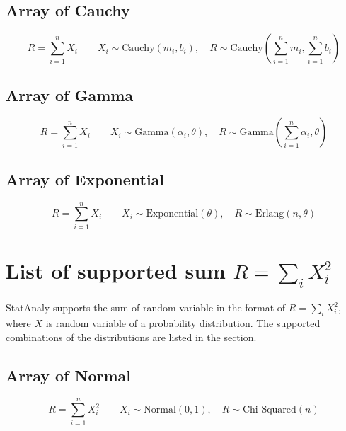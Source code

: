\subsection{Array of Cauchy}

    \begin{equation}
        R = \sum_{i=1}^n X_i \qquad 
        X_i \sim \text{Cauchy}(m_i,b_i), \quad 
        R \sim \text{Cauchy}\left(\sum _{i=1}^{n}m_{i},\sum _{i=1}^{n}b _{i}\right)
    \end{equation}

\subsection{Array of Gamma}

    \begin{equation}
        R = \sum_{i=1}^n X_i \qquad 
        X_i \sim \text{Gamma}(\alpha_i,\theta), \quad 
        R \sim \text{Gamma}\left(\sum _{i=1}^{n}\alpha_{i},\theta \right)
    \end{equation}

\subsection{Array of Exponential}

    \begin{equation}
        R = \sum_{i=1}^n X_i \qquad 
        X_i \sim \text{Exponential}(\theta), \quad 
        R \sim \text{Erlang}\left(n, \theta \right)
    \end{equation}


\section{List of supported sum $R = \sum_i X_i^2$}

StatAnaly supports the sum of random variable in the format of $R = \sum_i X_i^2$, where $X$ is random variable of a probability distribution.
The supported combinations of the distributions are listed in the section.

\subsection{Array of Normal}

\begin{equation}
    R = \sum_{i=1}^n X_i^2 \qquad 
    X_i \sim \text{Normal}(0,1), \quad 
    R \sim \text{Chi-Squared}\left( n \right)
\end{equation}

